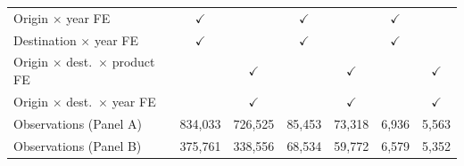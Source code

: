 \begin{tabular}{lcccccc}
Origin $\times$ year FE & $\checkmark$ &  & $\checkmark$ &  & $\checkmark$ &  \\
Destination $\times$ year FE & $\checkmark$ &  & $\checkmark$ &  & $\checkmark$ &  \\
Origin $\times$ dest.\ $\times$ product FE &  & $\checkmark$ &  & $\checkmark$ &  & $\checkmark$ \\
Origin $\times$ dest.\ $\times$ year FE &  & $\checkmark$ &  & $\checkmark$ &  & $\checkmark$ \\
Observations (Panel A) & 834,033 & 726,525 & 85,453 & 73,318 & 6,936 & 5,563 \\
Observations (Panel B) & 375,761 & 338,556 & 68,534 & 59,772 & 6,579 & 5,352 \\
\hline
\end{tabular}
